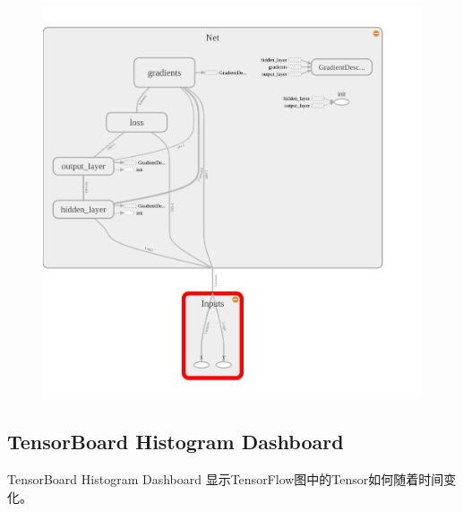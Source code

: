 \begin{figure}[H]
	\includegraphics[scale=0.4]{./pic/chapter1/tenbor1.png}
\end{figure}
\subsection{TensorBoard Histogram Dashboard}
TensorBoard Histogram Dashboard 显示TensorFlow图中的Tensor如何随着时间变化。
